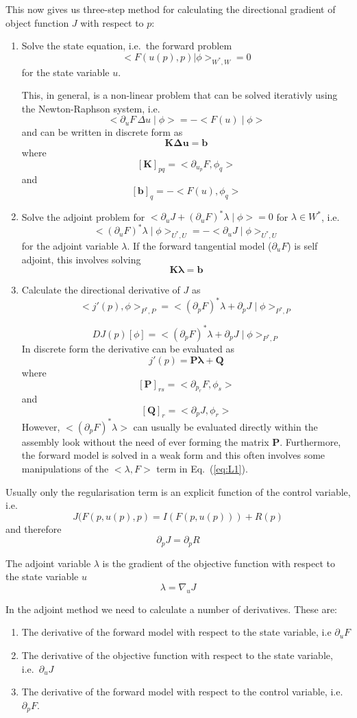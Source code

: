 \documentclass[10pt,a4paper]{book}
\newcommand{\p}{\partial}
\begin{document}
This now gives us three-step method for calculating the directional
gradient of object function $J$ with respect to $p$:
\begin{enumerate}
\item Solve the state equation, i.e.\ the forward problem 
\[ 
<F(u(p),p)| \phi >_{W^\ast , W} = 0 
\]
 for the state variable $u$. 
  
This, in  general, is a non-linear problem that can be solved iterativly using the Newton-Raphson system, i.e. 
\[
 < \p_u F \, \Delta u \mid \phi > = - <F(u) \mid \phi> 
\]
and can be written in discrete form as
\[
 \bm{K} \bm{\Delta u} = \bm{b}
\]
where
\[ [\bm{K}]_{pq} = < \p_{u_p} F , \phi_q > \]
and
\[ [\bm{b}]_q= - < F(u) , \phi_q > \] 

\item Solve the adjoint problem for $< \p_u J +( \p_u F)^\ast\lambda \mid \phi >  =0$ for $\lambda \in W^\ast$, i.e.
\[
  <( \p_u F)^\ast\lambda \mid \phi >_{U^\ast , U}  = - < \p_u J \mid \phi >_{U^\ast , U} 
\]
for the adjoint variable $\lambda$. If the forward tangential model
($\p_u F$) is self adjoint, this involves solving
\[
 \bm{K} \bm{\lambda} = \bm{b}
\]

\item Calculate the directional derivative of $J$ as 
\[ 
 <j'(p),\phi>_{P^\ast,P} = < (\p_p F)^\ast \lambda  + \p_p J \mid  \phi >_{P^\ast,P} 
\]


\[ 
 D J(p)[\phi] = < (\p_p F)^\ast \lambda  + \p_p J \mid  \phi >_{P^\ast,P} 
\]
In discrete form the derivative can be evaluated as
\[
j'(p)= \bm{P} \bm{\lambda} + \bm{Q}
\]
where
\[ [\bm{P}]_{rs} = < \p_{p_r} F , \phi_s > \]
and
\[ [\bm{Q}]_r =< \p_p J , \phi_r > \] However,
$< (\p_p F)^\ast \lambda >$ can usually be evaluated directly within
the assembly look without the need of ever forming the matrix
$\bm{P}$. Furthermore, the forward model is solved in a weak form and
this often involves some manipulations of the $< \lambda , F >$ term
in Eq.~(\ref{eq:L1}).
 \end{enumerate}


Usually only the regularisation term is an explicit function of the
control variable, i.e.
\[
 J(F(p,u(p),p)=I(F(p,u(p)))+R(p)
\]
and therefore
\[
  \p_p J=  \p_p R 
\]




The adjoint variable $\lambda$ is the gradient of the objective
function with respect to the state variable $u$
\[
\lambda= \nabla_u J
\] 


In the adjoint method we need to calculate a number of derivatives. These are:
\begin{enumerate}
\item The derivative of the forward model with respect to the state variable, i.e $\p_u F $
\item The derivative of the objective function with respect to the state variable, i.e.\ $\p_u J$
\item The derivative of the forward model with respect to the control variable, i.e.\ $\p_p F$.
\end{enumerate}
\end{document}
